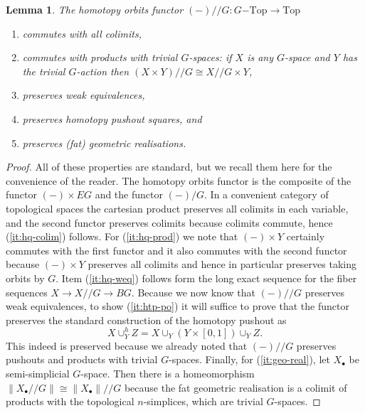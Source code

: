 \documentclass{amsart}
\theoremstyle{plain}
\newtheorem{lem}[thm]{Lemma}
\theoremstyle{definition}
\newcommand{\hq}{/\!\!/} %
\begin{document}
\begin{lem}\label{lem:homotopy-orbits-functor}
    The homotopy orbits functor $
        (-)\hq G\colon G\mathrm{-Top} \longrightarrow \mathrm{Top}$
    \begin{enumerate}
        \item\label{it:hq-colim}
        commutes with all colimits,
        \item\label{it:hq-prod}
        commutes with products with trivial $G$-spaces:
        if $X$ is any $G$-space and $Y$ has the trivial $G$-action then $(X \times Y) \hq G \cong X \hq G \times Y$,
        \item\label{it:hq-weq}
        preserves weak equivalences,
        \item\label{it:htp-po}
        preserves homotopy pushout squares, and
        \item\label{it:geo-real}
        preserves (fat) geometric realisations.
    \end{enumerate}
\end{lem}
\begin{proof}
    All of these properties are standard, but we recall them here for the convenience of the reader.
    The homotopy orbits functor is the composite of the functor $(-) \times EG$ and the functor $(-)/G$.
    In a convenient category of topological spaces the cartesian product preserves all colimits in each variable, and the second functor preserves colimits because colimits commute, hence (\ref{it:hq-colim}) follows.
    For (\ref{it:hq-prod}) we note that $(-)\times Y$ certainly commutes with the first functor and it also commutes with the second functor because $(-) \times Y$ preserves all colimits and hence in particular preserves taking orbits by $G$.
    Item (\ref{it:hq-weq}) follows form the long exact sequence for the fiber sequences $X \to X \hq G \to BG$.
    Because we now know that $(-)\hq G$ preserves weak equivalences, to show (\ref{it:htp-po}) it will suffice to prove that the functor preserves the standard construction of the homotopy pushout as
    \[
        X \cup^h_Y Z = X \cup_Y (Y \times [0,1]) \cup_Y Z.
    \]
    This indeed is preserved because we already noted that $(-)\hq G$ preserves pushouts and products with trivial $G$-spaces.
    Finally, for (\ref{it:geo-real}), let $X_\bullet$ be semi-simplicial $G$-space.
    Then there is a homeomorphism $\|X_\bullet \hq G\| \cong \|X_\bullet\|\hq G$ because the fat geometric realisation is a colimit of products with the topological $n$-simplices, which are trivial $G$-spaces.
\end{proof}
\end{document}
